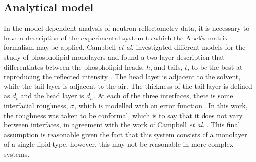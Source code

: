 \documentclass[
 reprint,
 superscriptaddress,
 amsmath,amssymb,
 aps,
]{revtex4-1}
\begin{document}
\subsection{\label{models} Analytical model}

In the model-dependent analysis of neutron reflectometry data, it is necessary to have a description of the experimental system to which the Abel\`{e}s matrix formalism may be applied. 
Campbell \emph{et al.} investigated different models for the study of phospholipid monolayers and found a two-layer description that differentiates between the phospholipid heads, $h$, and tails, $t$, to be the best at reproducing the reflected intensity \cite{campbell_structure_2018}. 
The head layer is adjacent to the solvent, while the tail layer is adjacent to the air. 
The thickness of the tail layer is defined as $d_t$ and the head layer is $d_h$.
At each of the three interfaces, there is some interfacial roughness, $\sigma$, which is modelled with an error function \cite{nevot_caracterisation_1980}.
In this work, the roughness was taken to be conformal, which is to say that it does not vary between interfaces, in agreement with the work of Campbell \emph{et al.} \cite{campbell_structure_2018}.
This final assumption is reasonable given the fact that this system consists of a monolayer of a single lipid type, however, this may not be reasonable in more complex systems. 
\end{document}
